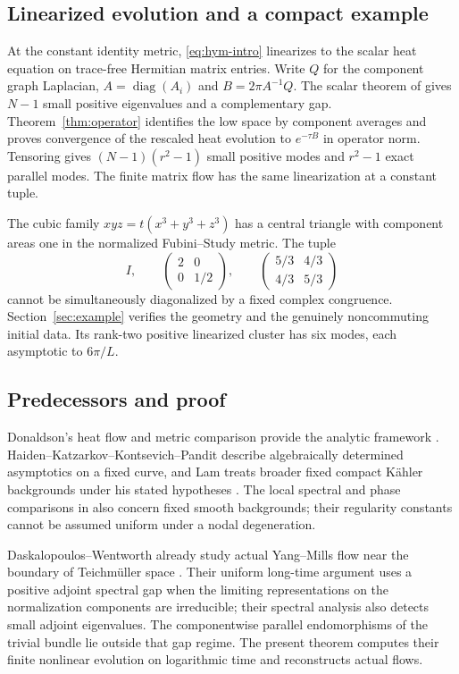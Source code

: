 \subsection{Linearized evolution and a compact example}
At the constant identity metric, \eqref{eq:hym-intro} linearizes to the
scalar heat equation on trace-free Hermitian matrix entries. Write $Q$
for the component graph Laplacian, $A=\operatorname{diag}(A_i)$ and
$B=2\pi A^{-1}Q$. The scalar theorem of \cite{wuebben-curves} gives
$N-1$ small positive eigenvalues and a complementary gap.
Theorem~\ref{thm:operator} identifies the low space by component averages
and proves convergence of the rescaled heat evolution to $e^{-\tau B}$
in operator norm. Tensoring gives $(N-1)(r^2-1)$ small positive modes
and $r^2-1$ exact parallel modes. The finite matrix flow has the same
linearization at a constant tuple.

The cubic family $xyz=t(x^3+y^3+z^3)$ has a central triangle with
component areas one in the normalized Fubini--Study metric. The tuple
\begin{equation}\label{eq:example-tuple-intro}
 I,\qquad\begin{pmatrix}2&0\\0&1/2\end{pmatrix},\qquad
 \begin{pmatrix}5/3&4/3\\4/3&5/3\end{pmatrix}
\end{equation}
cannot be simultaneously diagonalized by a fixed complex congruence.
Section~\ref{sec:example} verifies the geometry and the genuinely
noncommuting initial data. Its rank-two positive linearized cluster
has six modes, each asymptotic to $6\pi/L$.

\subsection{Predecessors and proof}
Donaldson's heat flow and metric comparison provide the analytic
framework \cite{donaldson,hkkp}. Haiden--Katzarkov--Kontsevich--Pandit
describe algebraically determined asymptotics on a fixed curve, and
Lam treats broader fixed compact K\"ahler backgrounds under his stated
hypotheses \cite{lam}. The local spectral and phase comparisons in
\cite{wuebben-local,wuebben-phase} also concern fixed smooth
backgrounds; their regularity constants cannot be assumed uniform
under a nodal degeneration.

Daskalopoulos--Wentworth already study actual Yang--Mills flow near
the boundary of Teichm\"uller space \cite{dw}. Their uniform long-time
argument uses a positive adjoint spectral gap when the limiting
representations on the normalization components are irreducible;
their spectral analysis also detects small adjoint eigenvalues.
The componentwise parallel endomorphisms of the trivial bundle lie
outside that gap regime. The present theorem computes their finite
nonlinear evolution on logarithmic time and reconstructs actual flows.

